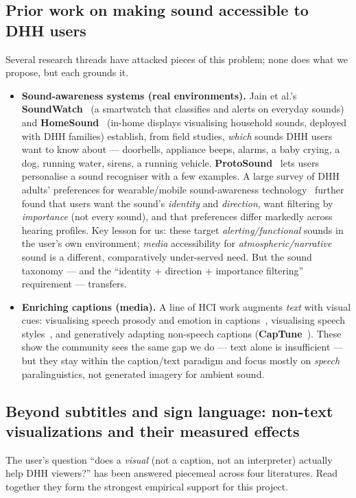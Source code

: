 \documentclass[11pt,a4paper]{article}
\begin{document}
\subsection{Prior work on making sound accessible to DHH users}
Several research threads have attacked pieces of this problem; none does what we propose, but each
grounds it.
\begin{itemize}
  \item \textbf{Sound-awareness systems (real environments).} Jain et al.'s
    \textbf{SoundWatch}~\cite{soundwatch} (a smartwatch that classifies and alerts on everyday
    sounds) and \textbf{HomeSound}~\cite{homesound} (in-home displays visualising household sounds,
    deployed with DHH families) establish, from field studies, \emph{which} sounds DHH users want to
    know about --- doorbells, appliance beeps, alarms, a baby crying, a dog, running water, sirens,
    a running vehicle. \textbf{ProtoSound}~\cite{protosound} lets users personalise a sound
    recogniser with a few examples. A large survey of DHH adults' preferences for wearable/mobile
    sound-awareness technology~\cite{jainprefs} further found that users want the sound's
    \emph{identity} and \emph{direction}, want filtering by \emph{importance} (not every sound), and
    that preferences differ markedly across hearing profiles. Key lesson for us: these target
    \emph{alerting/functional} sounds in the user's own environment; \emph{media} accessibility for
    \emph{atmospheric/narrative} sound is a different, comparatively under-served need. But the sound
    taxonomy --- and the ``identity + direction + importance filtering'' requirement --- transfers.
  \item \textbf{Enriching captions (media).} A line of HCI work augments \emph{text} with visual cues:
    visualising speech prosody and emotion in captions~\cite{prosodycaptions}, visualising speech
    styles~\cite{speechstyles}, and generatively adapting non-speech captions
    (\textbf{CapTune}~\cite{captune}). These show the community sees the same gap we do --- text alone
    is insufficient --- but they stay within the caption/text paradigm and focus mostly on \emph{speech}
    paralinguistics, not generated imagery for ambient sound.
\end{itemize}

\subsection{Beyond subtitles and sign language: non-text visualizations and their measured effects}
The user's question ``does a \emph{visual} (not a caption, not an interpreter) actually help DHH
viewers?'' has been answered piecemeal across four literatures. Read together they form the strongest
empirical support for this project.
\end{document}
